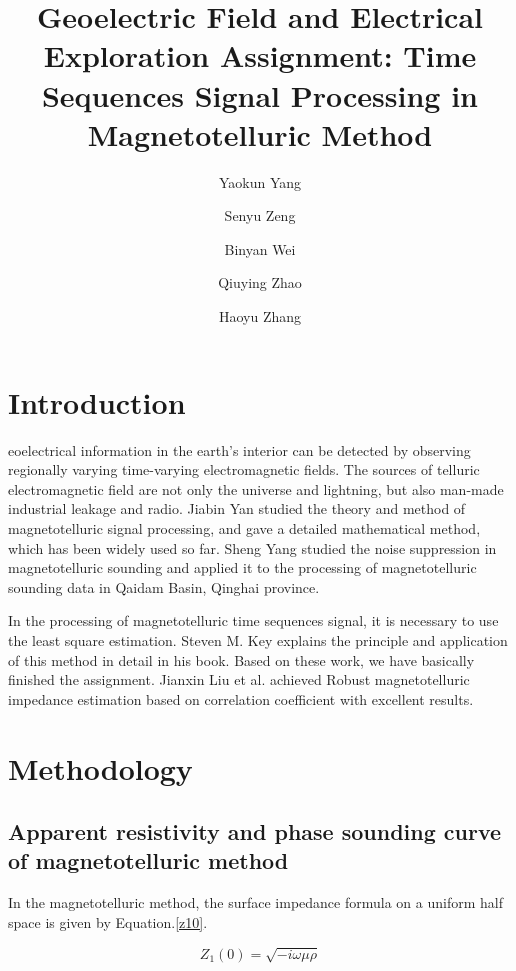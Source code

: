 \documentclass[9pt,a4paper,twoside]{rho-class/rho}
\title{Geoelectric Field and Electrical Exploration Assignment: Time Sequences Signal Processing in Magnetotelluric Method}
\author[1]{Yaokun Yang}
\author[1]{Senyu Zeng}
\author[1]{Binyan Wei}
\author[1]{Qiuying Zhao}
\author[1]{Haoyu Zhang}
\affil[1]{Shcool of Geoscience and Info-physics, Central South University, Changsha 410083, China.}
\begin{document}
	
    \maketitle
    \thispagestyle{firststyle}
    \linenumbers


\section{Introduction}

eoelectrical information in the earth's interior can be detected by observing regionally varying time-varying electromagnetic fields. The sources of telluric electromagnetic field are not only the universe and lightning, but also man-made industrial leakage and radio. Jiabin Yan \cite{yan2004phd} studied the theory and method of magnetotelluric signal processing, and gave a detailed mathematical method, which has been widely used so far. Sheng Yang \cite{yang2004phd} studied the noise suppression in magnetotelluric sounding and applied it to the processing of magnetotelluric sounding data in Qaidam Basin, Qinghai province.

In the processing of magnetotelluric time sequences signal, it is necessary to use the least square estimation. Steven M. Key\cite{steven1993,steven1998} explains the principle and application of this method in detail in his book. Based on these work, we have basically finished the assignment. Jianxin Liu et al.\cite{liu2003} achieved Robust magnetotelluric impedance estimation based on correlation coefficient with excellent results.

\section{Methodology}

\subsection{Apparent resistivity and phase sounding curve of magnetotelluric method}

In the magnetotelluric method\cite{yan2024lectures}, the surface impedance formula on a uniform half space is given by Equation.\eqref{z10}. 

\begin{equation}
    \label{z10}
    Z_1(0)=\sqrt{-i\omega \mu\rho}
\end{equation}
\end{document}
